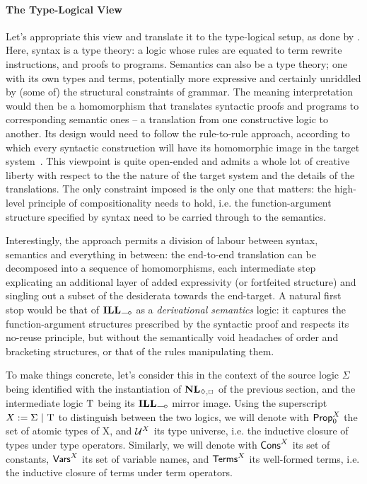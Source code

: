 \paragraph{The Type-Logical View}
Let's appropriate this view and translate it to the type-logical setup, as done by \citet{van1988semantics}.
Here, syntax is a type theory: a logic whose rules are equated to term rewrite instructions, and proofs to programs.
Semantics can also be a type theory; one with its own types and terms, potentially more expressive and certainly unriddled by (some of) the structural constraints of grammar.
The meaning interpretation would then be a homomorphism that translates syntactic proofs and programs to corresponding semantic ones -- a translation from one constructive logic to another.
Its design would need to follow the rule-to-rule approach, according to which every syntactic construction will have its homomorphic image in the target system~\cite{bach1976extension}.
This viewpoint is quite open-ended and admits a whole lot of creative liberty with respect to the the nature of the target system and the details of the translations.
The only constraint imposed is the only one that matters: the high-level principle of compositionality needs to hold, i.e. the function-argument structure specified by syntax need to be carried through to the semantics.

Interestingly, the approach permits a division of labour between syntax, semantics and everything in between: the end-to-end translation can be decomposed into a sequence of homomorphisms, each intermediate step explicating an additional layer of added expressivity (or fortfeited structure) and singling out a subset of the desiderata towards the end-target.
A natural first stop would be that of $\ILL_{\li}$ as a \textit{derivational semantics} logic: it captures the function-argument structures prescribed by the syntactic proof and respects its no-reuse principle, but without the semantically void headaches of order and bracketing structures, or that of the rules manipulating them. 

To make things concrete, let's consider this in the context of the source logic $\Sigma$ being identified with the instantiation of $\NL_{\diamond,\Box}$ of the previous section, and the intermediate logic $\mathrm{T}$ being its $\ILL_{\li}$ mirror image.
Using the superscript $X := \Sigma \ | \ \mathrm{T}$ to distinguish between the two logics,
we will denote with $\mathsf{Prop}_0^X$ the set of atomic types of X, and $\mathcal{U}^X$ its type universe, i.e. the inductive closure of types under type operators.
Similarly, we will denote with $\mathsf{Cons}^{X}$ its set of constants, $\mathsf{Vars}^{X}$ its set of variable names, and $\mathsf{Terms}^{X}$ its well-formed terms, i.e. the inductive closure of terms under term operators.


